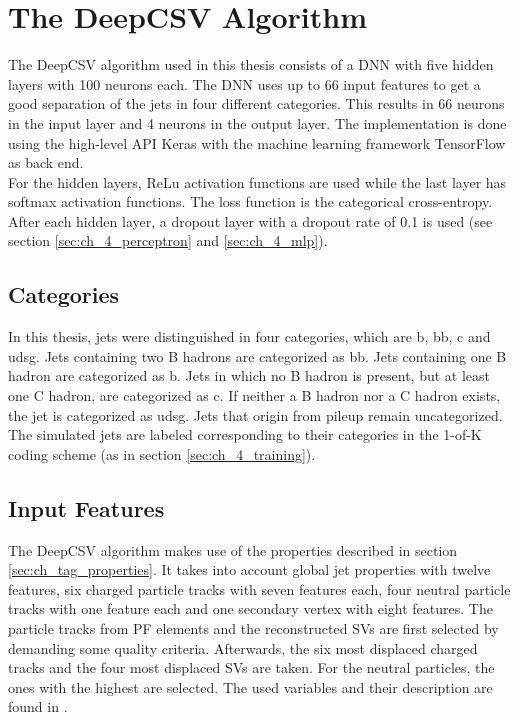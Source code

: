 


\section{The DeepCSV Algorithm}\label{sec:ch_deepCSV}
The DeepCSV algorithm used in this thesis consists of a DNN with five hidden layers with 100 neurons each. The DNN uses up to 66 input features to get a good separation of the jets in four different categories. This results in 66 neurons in the input layer and 4 neurons in the output layer. The implementation is done using the high-level API Keras \cite{Keras} with the machine learning framework TensorFlow \cite{Tensorflow} as back end.\\

For the hidden layers, ReLu activation functions are used while the last layer has softmax activation functions. The loss function is the categorical cross-entropy. After each hidden layer, a dropout layer with a dropout rate of 0.1 is used (see section \ref{sec:ch_4_perceptron} and \ref{sec:ch_4_mlp}). 

\subsection{Categories}
In this thesis, jets were distinguished in four categories, which are b, bb, c and udsg. Jets containing two B hadrons are categorized as bb. Jets containing one B hadron are categorized as b. Jets in which no B hadron is present, but at least one C hadron, are categorized as c. If neither a B hadron nor a C hadron exists, the jet is categorized as udsg. Jets that origin from pileup remain uncategorized. The simulated jets are labeled corresponding to their categories in the 1-of-K coding scheme (as in section \ref{sec:ch_4_training}). \\

\subsection{Input Features}
The DeepCSV algorithm makes use of the properties described in section \ref{sec:ch_tag_properties}. It takes into account global jet properties with twelve features, six charged particle tracks with seven features each, four neutral particle tracks with one feature each and one secondary vertex with eight features. The particle tracks from PF elements and the reconstructed SVs are first selected by demanding some quality criteria. Afterwards, the six most displaced charged tracks and the four most displaced SVs are taken. For the neutral particles, the ones with the highest \pt are selected. The used variables and their description are found in \cite{HeavyFlavorIdentification}.\\

